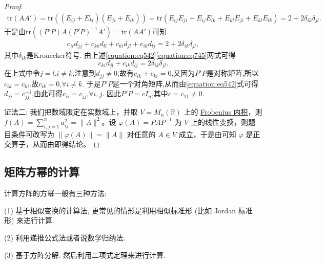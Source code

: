 \documentclass[../../main.tex]{subfiles}%
\begin{document}
\begin{proof}
\begin{align*}
\mathrm{tr}\left( AA' \right) =\mathrm{tr}\left( \left( E_{ij}+E_{kl} \right) \left( E_{ji}+E_{lk} \right) \right) =\mathrm{tr}\left( E_{ij}E_{ji}+E_{ij}E_{lk}+E_{kl}E_{ji}+E_{kl}E_{lk} \right)=2 + 2\delta_{ik}\delta_{jl}.    
\end{align*}
于是由$\text{tr}((P'P)A(P'P)^{-1}A')=\text{tr}(AA')$可知
\begin{align}\label{equation:eq745}
c_{ii}d_{jj}+c_{kk}d_{ll}+c_{ki}d_{jl}+c_{ik}d_{lj}=2 + 2\delta_{ik}\delta_{jl},  
\end{align}
其中\(\delta_{ik}\)是Kronecker符号. 由上述\eqref{equation:eq542}\eqref{equation:eq745}两式可得
\[
c_{ki}d_{jl}+c_{ik}d_{lj}=2\delta_{ik}\delta_{jl}.
\]
在上式中令\(j = l\),\(i\neq k\),注意到\(d_{jj}\neq0\),故有\(c_{ik}+c_{ki}=0\),又因为\(P'P\)是对称矩阵,所以\(c_{ik}=c_{ki}\).故\(c_{ik}=0\),\(\forall i\neq k\). 于是\(P'P\)是一个对角矩阵,从而由\eqref{equation:eq542}式可得\(d_{jj}=c_{jj}^{-1}\),由此可得\(c_{ii}=c_{jj}\),\(\forall i,j\). 因此\(P'P = cI_n\),其中\(c = c_{11}\neq0\).

{\color{blue}证法二:}
我们把数域限定在实数域上，并取 \(V = M_n(\mathbb{R})\) 上的 \hyperlink{Frobenius 内积}{Frobenius 内积}，则 \(f(A)=\sum_{i,j = 1}^{n}a_{ij}^2=\|A\|^2\)。设 \(\varphi(A)=PAP^{-1}\) 为 \(V\) 上的线性变换，则题目条件可改写为 \(\|\varphi(A)\|=\|A\|\) 对任意的 \(A\in V\) 成立，于是由可知 \(\varphi\) 是正交算子，从而由即得结论。
\end{proof}


\subsection{矩阵方幂的计算}

计算方阵的方幂一般有三种方法:

(1) 基于相似变换的计算法, 更常见的情形是利用相似标准形 (比如 Jordan 标准形) 来进行计算.

(2) 利用递推公式法或者说数学归纳法.

(3) 基于方阵分解. 然后利用二项式定理来进行计算.
\end{document}
